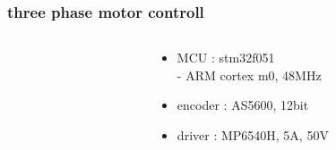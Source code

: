 \documentclass{beamer}
\begin{document}
\begin{frame}
  
  \frametitle{\bf three phase motor controll}    

  \begin{columns}

    \begin{column}{0.5\textwidth}
    \end{column}

    \begin{column}{0.5\textwidth}
      \begin{itemize}
        \item MCU     : stm32f051 \\ 
          - ARM cortex m0, 48MHz
        \item encoder : AS5600, 12bit
        \item driver  : MP6540H, 5A, 50V
      \end{itemize}
    \end{column}

  \end{columns}

\end{frame}
\end{document}
